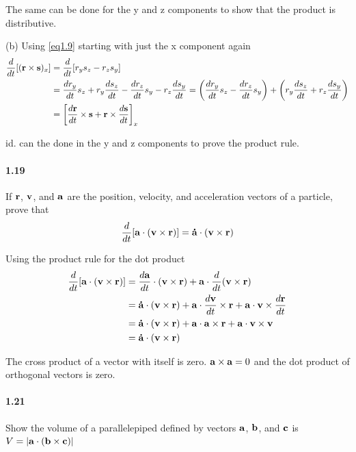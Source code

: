 \documentclass[../problems.tex]{subfiles}
\begin{document}
The same can be done for the y and z components to show that the product is distributive.

\newpage
(b) Using \eqref{eq1.9} starting with just the x component again
\begin{align*}
    \frac{d}{dt} [(\mathbf{r} \times \mathbf{s})_x] &= \frac{d}{dt} [r_y s_z - r_z s_y] \\
    &= \frac{dr_y}{dt} s_z + r_y \frac{ds_z}{dt} - \frac{dr_z}{dt} s_y - r_z \frac{ds_y}{dt} 
    = \left(\frac{dr_y}{dt}s_z - \frac{dr_z}{dt} s_y\right) 
    + \left(  r_y \frac{ds_z}{dt} + r_z \frac{ds_y}{dt} \right) \\
    &= \left[ \frac{d\mathbf{r}}{dt} \times \mathbf{s} 
    + \mathbf{r} \times \frac{d\mathbf{s}}{dt} \right]_x
\end{align*}

id. can the done in the y and z components to prove the product rule.

\paragraph{1.19}
If $\mathbf{r}$, $\mathbf{v}$, and $\mathbf{a}$ are the position, velocity, and acceleration vectors of a 
particle, prove that
\begin{equation*}
    \frac{d}{dt} [\mathbf{a} \cdot (\mathbf{v} \times \mathbf{r})] = \mathbf{\dot a} \cdot (\mathbf{v} 
    \times \mathbf{r})
\end{equation*}
\barh

Using the product rule for the dot product
\begin{align*}
    \frac{d}{dt} [\mathbf{a} \cdot (\mathbf{v} \times \mathbf{r})] 
    &= \frac{d\mathbf{a}}{dt} \cdot (\mathbf{v} \times \mathbf{r}) 
    + \mathbf{a} \cdot \frac{d}{dt} (\mathbf{v} \times \mathbf{r}) \\
    &= \mathbf{\dot a} \cdot (\mathbf{v} \times \mathbf{r}) 
    + \mathbf{a} \cdot \frac{d\mathbf{v}}{dt} \times \mathbf{r} 
    + \mathbf{a} \cdot \mathbf{v} \times \frac{d\mathbf{r}}{dt} \\
    &= \mathbf{\dot a} \cdot (\mathbf{v} \times \mathbf{r}) 
    + \mathbf{a} \cdot \mathbf{a} \times \mathbf{r} + \mathbf{a} \cdot \mathbf{v} \times \mathbf{v} \\
    &= \mathbf{\dot a} \cdot (\mathbf{v} \times \mathbf{r})
\end{align*}

The cross product of a vector with itself is zero. $\mathbf{a} \times \mathbf{a} = 0$ and the dot 
product of orthogonal vectors is zero.

\paragraph{1.21}
Show the volume of a parallelepiped defined by vectors $\mathbf{a}$, $\mathbf{b}$, and $\mathbf{c}$ is 
$V = |\mathbf{a} \cdot (\mathbf{b} \times \mathbf{c})|$
\barh
\end{document}
